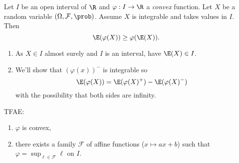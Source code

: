 \documentclass[a4paper]{article}
\renewcommand{\P}{\prob} %
\begin{document}
\begin{proposition}
  \label{prop:Jensen inequality}
  Let \(I\) be an open interval of \(\R\) and \(\varphi: I \to \R\) a \emph{convex} function. Let \(X\) be a random variable \((\Omega, \mathcal F, \P)\). Assume \(X\) is integrable and takes values in \(I\). Then
  \[
    \E(\varphi(X)) \geq \varphi(\E(X)).
  \]
\end{proposition}

\begin{remark}\leavevmode
  \begin{enumerate}
  \item As \(X \in I\) almost surely and \(I\) is an interval, have \(\E(X) \in I\).
  \item We'll show that \((\varphi(x))^-\) is integrable so
    \[
      \E(\varphi(X)) = \E(\varphi(X)^+) - \E(\varphi(X)^-)
    \]
    with the possibility that both sides are infinity.
  \end{enumerate}
\end{remark}

\begin{lemma}
  TFAE:
  \begin{enumerate}
  \item \(\varphi\) is convex,
  \item there exists a family \(\mathcal F\) of affine functions (\(x \mapsto ax + b\)) such that \(\varphi = \sup_{\ell \in \mathcal F} \ell\) on \(I\).
  \end{enumerate}
\end{lemma}
\end{document}
